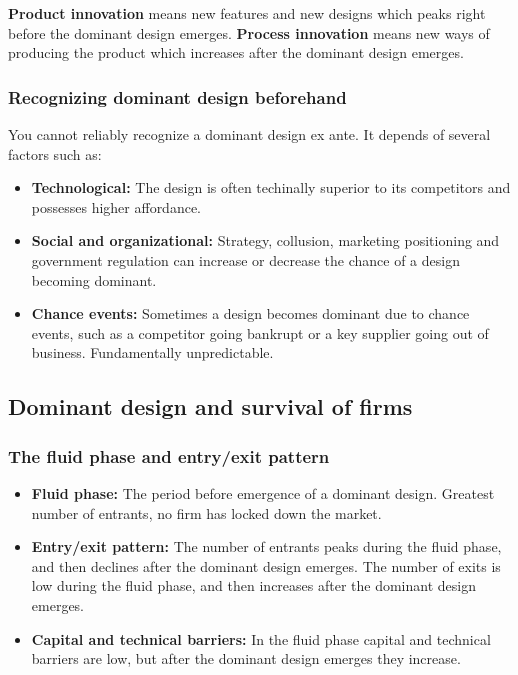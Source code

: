\documentclass[12pt,a4paper]{article}
\begin{document}
\textbf{Product innovation} means new features and new designs which peaks right before the dominant design emerges. \textbf{Process innovation} means new ways of producing the product which increases after the dominant design emerges.

\subsubsection{Recognizing dominant design beforehand}
You cannot reliably recognize a dominant design ex ante. It depends of several factors such as:
\begin{itemize}
    \item \textbf{Technological:} The design is often techinally superior to its competitors and possesses higher affordance.
    \item \textbf{Social and organizational:} Strategy, collusion, marketing positioning and government regulation can increase or decrease the chance of a design becoming dominant.
    \item \textbf{Chance events:} Sometimes a design becomes dominant due to chance events, such as a competitor going bankrupt or a key supplier going out of business. Fundamentally unpredictable.
\end{itemize}

\subsection{Dominant design and survival of firms}
\subsubsection{The fluid phase and entry/exit pattern}
\begin{itemize}
    \item \textbf{Fluid phase:} The period before emergence of a dominant design. Greatest number of entrants, no firm has locked down the market. 
    \item \textbf{Entry/exit pattern:} The number of entrants peaks during the fluid phase, and then declines after the dominant design emerges. The number of exits is low during the fluid phase, and then increases after the dominant design emerges.
    \item \textbf{Capital and technical barriers:} In the fluid phase capital and technical barriers are low, but after the dominant design emerges they increase.
\end{itemize}
\end{document}
